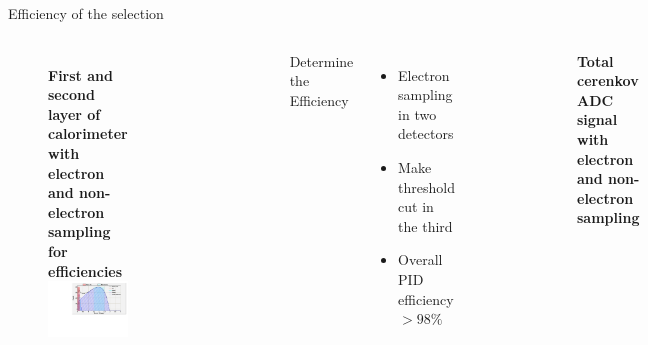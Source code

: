 \documentclass{beamer}
\begin{document}

\begin{frame}{Efficiency of the selection}
	\vspace{-10pt}
	\begin{block}{}
		\begin{columns}
			\vspace{-18pt}
			\begin{figure}
				\textbf{First and second layer of calorimeter with electron and non-electron sampling for efficiencies }
				\includegraphics[width=4.50cm]{../images/Lprl1.pdf}
			\end{figure}
			\vspace{-23pt}
			\begin{figure}
				\includegraphics[width=4.50cm]{../images/Lprl2.pdf}
			\end{figure}
			Determine the Efficiency
			
			\begin{itemize}
				\item Electron sampling in two detectors
				\item Make threshold cut in the third
				\item Overall PID efficiency $> 98\% $
			\end{itemize}
			\vspace{-16pt}
			\begin{figure}
				\includegraphics[width=5.50cm]{../images/Lcerasum.pdf}
			\end{figure}
			\vspace{-16pt}
			\textbf{Total cerenkov ADC signal with electron and non-electron sampling}
		\end{columns}
	\end{block}
\end{frame}
\end{document}
